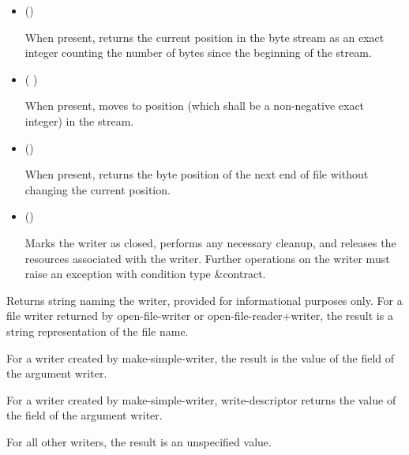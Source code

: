 \begin{entry}{%
}
\begin{itemize}
   may or may not be a bytes object returned by {\cf
    make-i/o-buffer}.
  
   may or may not be the same as the chunk size of the
  reader.

\item {\cf ()}
   
  When present,  returns the current position in the byte
  stream as an exact integer counting the number of bytes since the
  beginning of the stream.
   
\item {\cf ( )}
   
  When present,  moves to position  (which shall be a
  non-negative exact integer) in the stream.
  
\item {\cf ()}
   
    When present,  returns the byte position of the next end
    of file without changing the current position.
   
\item {\cf ()}
  
  Marks the writer as closed, performs any necessary
  cleanup, and releases the resources associated with the writer. Further
  operations on the writer must raise an exception with condition type
  {\cf\&contract}.
\end{itemize}
\end{entry}

\begin{entry}{%
}
   
Returns string naming the writer, provided for informational
purposes only. For a file writer returned by {\cf open-file-writer}
or {\cf open-file-reader+writer}, the result is a string
representation of the file name.
   
For a writer created by {\cf make-simple-writer}, the result is the
value of the  field of the argument writer.
\end{entry}

\begin{entry}{%
}
   
  For a writer created by {\cf make-simple-writer}, {\cf write-descriptor} 
  returns the value of the
   field of the argument writer.
  
  For all other writers, the result is an unspecified value.
\end{entry}


